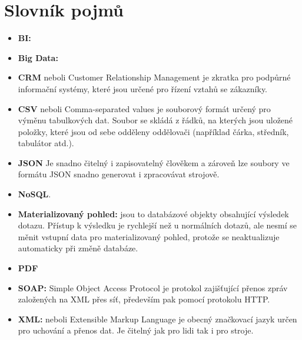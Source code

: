 \documentclass[czech,BP]{thesiskiv}
\begin{document}
\chapter{Slovník pojmů}
\label{Slovník}
\begin{itemize}
	\item[] \textbf{BI:}  \cite{BI}
	\item[] \textbf{Big Data:}  \cite{BigData}
	\item[] \textbf{CRM} neboli Customer Relationship Management je zkratka pro podpůrné informační systémy, které jsou určené pro řízení vztahů se zákazníky.
	\item[] \textbf{CSV} neboli Comma-separated values je souborový formát určený pro výměnu tabulkových dat. Soubor se skládá z řádků, na kterých jsou uložené položky, které jsou od sebe odděleny oddělovači (například čárka, středník, tabulátor atd.).
	\item[] \textbf{JSON}  Je snadno čitelný i zapisovatelný člověkem a zároveň lze soubory ve formátu JSON snadno generovat i zpracovávat strojově.\cite{JSON}
	\item[] \textbf{NoSQL}.\cite{NoSQL}
	\item[] \textbf{Materializovaný pohled:} jsou to databázové objekty obsahující výsledek dotazu. Přístup k výsledku je rychlejší než u normálních dotazů, ale nesmí se měnit vstupní data pro materializovaný pohled, protože se neaktualizuje automaticky při změně databáze.
	\item[] \textbf{PDF}  \citealp{PDF}
	\item[] \textbf{SOAP:} Simple Object Access Protocol je protokol zajišťující přenos zpráv založených na XML přes síť, především pak pomocí protokolu HTTP.
	\item[] \textbf{XML:} neboli Extensible Markup Language je obecný značkovací jazyk určen pro uchování a přenos dat. Je čitelný jak pro lidi tak i pro stroje.
\end{itemize}







{\raggedright\small

}
\end{document}
